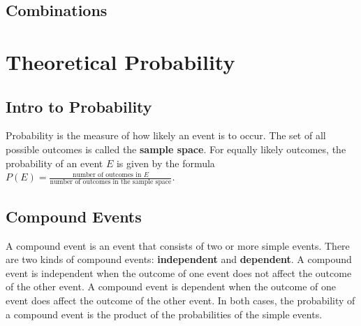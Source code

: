 \documentclass{report}
\begin{document}
\section{Combinations}


\chapter{Theoretical Probability}

\section{Intro to Probability}

Probability is the measure of how likely an event is to occur. The set of all possible outcomes is called the \textbf{sample space}. For equally likely outcomes, the probability of an event $E$ is given by the formula $P(E)=\frac{\text{number of outcomes in }E}{\text{number of outcomes in the sample space}}$.


\section{Compound Events}

A compound event is an event that consists of two or more simple events. There are two kinds of compound events: \textbf{independent} and \textbf{dependent}. A compound event is independent when the outcome of one event does not affect the outcome of the other event. A compound event is dependent when the outcome of one event does affect the outcome of the other event. In both cases, the probability of a compound event is the product of the probabilities of the simple events.

\end{document}
